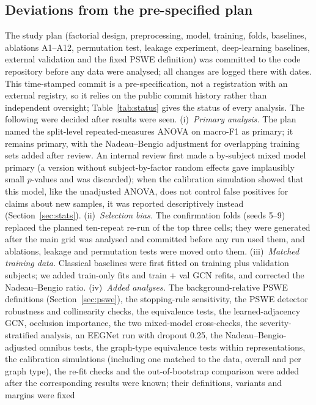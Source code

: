 \subsection{Deviations from the pre-specified plan}\label{sec:deviations}
The study plan (factorial design, preprocessing, model, training, folds, baselines, ablations A1--A12,
permutation test, leakage experiment, deep-learning baselines, external validation and the fixed PSWE
definition) was committed to the code repository before any data were analysed; all changes are logged
there with dates. This time-stamped commit is a pre-specification, not a registration with an external
registry, so it relies on the public commit history rather than independent oversight; Table~\ref{tab:status} gives the status of every analysis. The following
were decided after results were seen.
(i)~\emph{Primary analysis.} The plan named the split-level repeated-measures ANOVA on macro-F1 as primary;
it remains primary, with the Nadeau--Bengio adjustment for overlapping training sets added after review.
An internal review first made a by-subject mixed model primary (a version without subject-by-factor
random effects gave implausibly small $p$-values and was discarded); when the calibration simulation showed
that this model, like the unadjusted ANOVA, does not control false positives for claims about new samples,
it was reported descriptively instead (Section~\ref{sec:stats}).
(ii)~\emph{Selection bias.} The confirmation folds (seeds 5--9) replaced the planned ten-repeat re-run of the
top three cells; they were generated after the main grid was analysed and committed before any run used
them, and ablations, leakage and permutation tests were moved onto them.
(iii)~\emph{Matched training data.} Classical baselines were first fitted on training plus validation
subjects; we added train-only fits and train + val GCN refits, and corrected the Nadeau--Bengio ratio.
(iv)~\emph{Added analyses.} The background-relative PSWE definitions (Section~\ref{sec:pswe}), the
stopping-rule sensitivity, the PSWE detector robustness and collinearity checks, the equivalence tests,
the learned-adjacency GCN, occlusion importance, the two mixed-model cross-checks, the severity-stratified
analysis, an EEGNet run with dropout 0.25, the Nadeau--Bengio-adjusted omnibus tests, the graph-type
equivalence tests within representations, the calibration simulations (including one matched to the data, overall and per graph type), the re-fit checks and the out-of-bootstrap comparison were added after the corresponding results were known; their definitions, variants and margins were fixed
